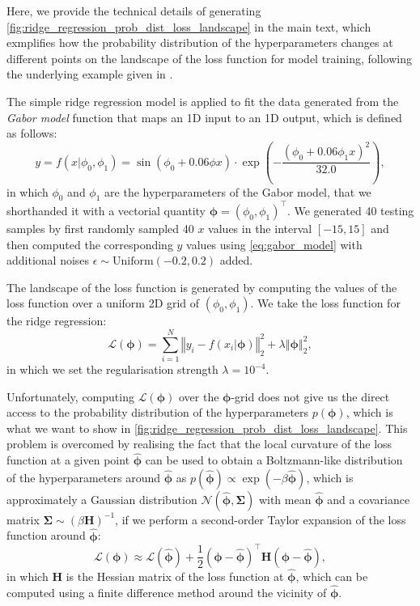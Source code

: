 
Here, we provide the technical details of generating \cref{fig:ridge_regression_prob_dist_loss_landscape} in the main text, which exmplifies how the probability distribution of the hyperparameters changes at different points on the landscape of the loss function for model training, following the underlying example given in \citet{prince2023understanding}.

The simple ridge regression model is applied to fit the data generated from the \emph{Gabor model} function that maps an 1D input to an 1D output, which is defined as follows:
\begin{equation}
    \label{eq:gabor_model}
 y=f(x|\phi_0,\phi_1)=\sin\left(\phi_0+0.06\phi x\right)\cdot\exp\left( -\frac{(\phi_0 + 0.06\phi_1 x)^2}{32.0}\right),
\end{equation}
in which $\phi_0$ and $\phi_1$ are the hyperparameters of the Gabor model, that we shorthanded it with a vectorial quantity $\boldsymbol{\phi}=(\phi_0,\phi_1)^\top$. We generated 40 testing samples by first randomly sampled 40 $x$ values in the interval $[-15,15]$ and then computed the corresponding $y$ values using \cref{eq:gabor_model} with additional noises $\epsilon\sim\mathrm{Uniform}(-0.2,0.2)$ added.

The landscape of the loss function is generated by computing the values of the loss function over a uniform 2D grid of $(\phi_0,\phi_1)$. We take the loss function for the ridge regression:
\begin{equation*}
    \label{eq:gabor_ridge_loss}
    \mathcal{L}(\boldsymbol{\phi})=\sum_{i=1}^{N}\left\Vert y_i-f(x_i|\boldsymbol{\phi} )\right\Vert_2^2+\lambda\left\Vert \boldsymbol{\phi} \right\Vert_2^2,
\end{equation*}
in which we set the regularisation strength $\lambda=10^{-4}$. 

Unfortunately, computing $\mathcal{L}(\boldsymbol{\phi})$ over the $\boldsymbol{\phi}$-grid does not give us the direct access to the probability distribution of the hyperparameters $p(\boldsymbol{\phi})$, which is what we want to show in \cref{fig:ridge_regression_prob_dist_loss_landscape}. This problem is overcomed by realising the fact that the local curvature of the loss function at a given point $\hat{\boldsymbol{\phi}}$ can be used to obtain a Boltzmann-like distribution of the hyperparameters around $\hat{\boldsymbol{\phi}}$ as $p(\hat{\boldsymbol{\phi}})\propto \exp(-\beta \hat{\boldsymbol{\phi}})$, which is approximately a Gaussian distribution $\mathcal{N}(\hat{\boldsymbol{\phi}},\boldsymbol{\Sigma})$ with mean $\hat{\boldsymbol{\phi}}$ and a covariance matrix $\boldsymbol{\Sigma}\sim(\beta\bm{H})^{-1}$, if we perform a second-order Taylor expansion of the loss function around $\hat{\boldsymbol{\phi}}$:
\begin{equation*}
    \label{eq:taylor_expansion_loss}
    \mathcal{L}(\boldsymbol{\phi})\approx \mathcal{L}(\hat{\boldsymbol{\phi}})+\frac{1}{2}(\boldsymbol{\phi}-\hat{\boldsymbol{\phi}})^\top \bm{H} (\boldsymbol{\phi}-\hat{\boldsymbol{\phi}}),
\end{equation*}
in which $\bm{H}$ is the Hessian matrix of the loss function at $\hat{\boldsymbol{\phi}}$, which can be computed using a finite difference method around the vicinity of $\hat{\boldsymbol{\phi}}$. 

